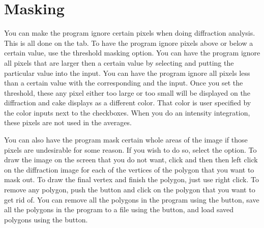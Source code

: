 \section{Masking}

You can make the program ignore certain pixels when doing
diffraction analysis. This is all done on the 
tab. To have the program ignore pixels above or below a 
certain value, use the threshold masking option.
You can have the program ignore all pixels that are larger 
then a certain value by selecting 
 and putting the particular value
into the  input.
You can have the program ignore all pixels less than a certain
value with the corresponding 
and the  input.
Once you set the threshold, these any pixel either too large
or too small will be displayed on the diffraction and cake
displays as a different color. That color is user 
specified by the color inputs next to the checkboxes. 
When you do an intensity integration, these pixels are 
not used in the averages.

You can also have the program mask certain whole areas 
of the image if those pixels are undesirable for some 
reason. If you wish to do so, select the 
 option. To draw the image on the
screen that you do not want, click  and
then then left click on the diffraction image for each 
of the vertices of the polygon that you want to mask out.
To draw the final vertex and finish the polygon, just
use right click. To remove any polygon, push the 
 button and click on the polygon that
you want to get rid of. You can remove all the polygons
in the program using the  button, save
all the polygons in the program to a file using the
 button, and load saved polygons using
the  button.

